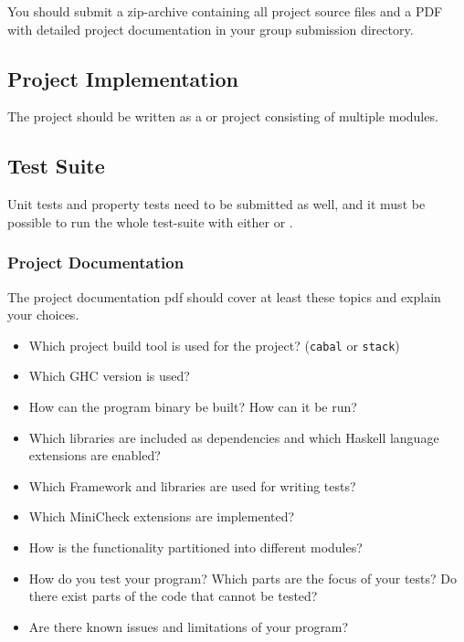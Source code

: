 \documentclass{article}
\begin{document}
You should submit a zip-archive containing all project source files and a PDF with detailed project documentation in your group submission directory.

\subsection{Project Implementation}

The project should be written as a  or  project consisting of multiple modules.

\subsection{Test Suite}

Unit tests and property tests need to be submitted as well, and it must be possible to run the whole test-suite with either  or .

\subsubsection*{Project Documentation}

The project documentation pdf should cover at least these topics and explain your choices.
\begin{itemize}
\item Which project build tool is used for the project? (\texttt{cabal} or \texttt{stack})
\item Which GHC version is used?
\item How can the program binary be built? How can it be run?
\item Which libraries are included as dependencies and which Haskell language extensions are enabled?
\item Which Framework and libraries are used for writing tests?
\item Which MiniCheck extensions are implemented?
\item How is the functionality partitioned into different modules?
\item How do you test your program? Which parts are the focus of your tests? Do there exist parts of the code that cannot be tested?
\item Are there known issues and limitations of your program?
\end{itemize}

\vspace*{1cm}

\printbibliography
\end{document}
